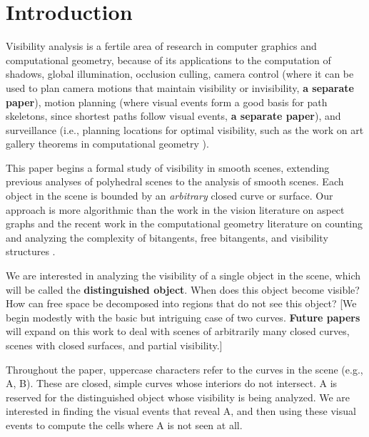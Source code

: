 \documentclass[12pt]{article}
\begin{document}
\clearpage


\section{Introduction}

Visibility analysis is a fertile area of research in computer graphics
and computational geometry, because of its applications to the computation of 
shadows,             %
global illumination,
occlusion culling,   %
camera control (where it can be used to plan camera motions that maintain visibility
  or invisibility, {\bf a separate paper}),
motion planning (where visual events form a good basis for path skeletons, 
since shortest paths follow visual events, {\bf a separate paper}), and
surveillance (i.e., planning locations for optimal visibility, such as 
the work on art gallery theorems in computational geometry \cite{orourke}).

This paper begins a formal study of visibility in smooth scenes,
extending previous analyses of polyhedral scenes 
\cite{durandthesis,discontinuity-mesh} to the analysis of smooth scenes.
Each object in the scene is bounded by an {\em arbitrary} closed curve or surface.
Our approach is more algorithmic than the work in the vision literature 
on aspect graphs \cite{aspectgraph}
and the recent work in the computational geometry literature 
on counting and analyzing the complexity of bitangents,
free bitangents, and visibility structures \cite{aggarwal,hazel}.

We are interested in analyzing the visibility of a single object in the scene,
which will be called the {\bf distinguished object}.
When does this object become visible?  
How can free space be decomposed into regions that do not see this object?
%
[We begin modestly with the basic but intriguing case of two curves.
{\bf Future papers} will expand on this work to deal with scenes of arbitrarily many 
closed curves, scenes with closed surfaces, and partial visibility.]

Throughout the paper, uppercase characters refer to the curves in the scene (e.g., A, B).
These are closed, simple curves whose interiors do not intersect.
A is reserved for the distinguished object whose visibility is being analyzed.
We are interested in finding the visual events that reveal A,
and then using these visual events to compute the cells where A is not seen at all.
\end{document}
